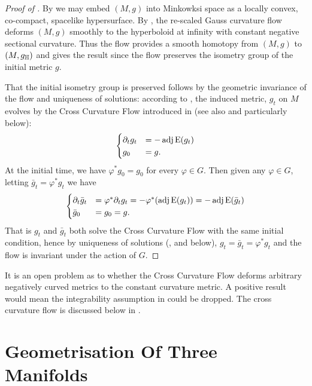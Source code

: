 \documentclass[a4paper, 12pt]{amsart}
\begin{document}
\begin{proof}
[Proof of ]

By  we may embed \((M, g)\) into Minkowksi space as a locally convex, co-compact, spacelike hypersurface. By \cite[Theorem 1.1]{MR3344442}, the re-scaled Gauss curvature flow deforms \((M, g)\) smoothly to the hyperboloid at infinity with constant negative sectional curvature. Thus the flow provides a smooth homotopy from \((M, g)\) to \((M, g_{\mathbb{H}})\) and  gives the result since the flow preserves the isometry group of the initial metric \(g\).

That the initial isometry group is preserved follows by the geometric invariance of the flow and uniqueness of solutions: according to \cite[12. Application to the cross-curvature flow]{MR3344442}, the induced metric, \(g_t\) on \(M\) evolves by the Cross Curvature Flow introduced in \cite{MR2055396} (see also  and particularly  below):
\[
\begin{cases}
\partial_t g_t &= -\operatorname{adj}\operatorname{E}(g_t) \\
g_0 &= g.
\end{cases}
\]
At the initial time, we have \(\varphi^{\ast} g_0 = g_0\) for every \(\varphi \in G\). Then given any \(\varphi \in G\), letting \(\bar{g}_t = \varphi^{\ast} g_t\) we have
\[
\begin{cases}
\partial_t \bar{g}_t &= \varphi^{\ast} \partial_t g_t = -\varphi^{\ast}(\operatorname{adj}\operatorname{E}(g_t)) = -\operatorname{adj}\operatorname{E}(\bar{g}_t) \\
\bar{g}_0 &= g_0 = g.
\end{cases}
\]
That is \(g_t\) and \(\bar{g}_t\) both solve the Cross Curvature Flow with the same initial condition, hence by uniqueness of solutions (\cite{MR2055396,MR2207496},  and  below), \(g_t = \bar{g}_t = \varphi^{\ast} g_t\) and the flow is invariant under the action of \(G\).
\end{proof}

\begin{rem}
It is an open problem as to whether the Cross Curvature Flow deforms arbitrary negatively curved metrics to the constant curvature metric. A positive result would mean the integrability assumption in  could be dropped. The cross curvature flow is discussed below in .
\end{rem}

\section{Geometrisation Of Three Manifolds}
\label{sec:geometrisation}
\end{document}

